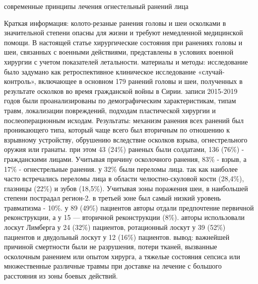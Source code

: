 
современные принципы лечения огнестельный ранений лица

Краткая информация: колото-резаные ранения головы и шеи осколками в значительной
степени опасны для жизни и требуют немедленной медицинской помощи. В настоящей
статье хирургические состояния при ранениях головы и шеи, связанных с военными
действиями, представлены в условиях военной хирургии с учетом показателей
летальности. материалы и методы: исследование было задумано как ретроспективное
клиническое исследование «случай-контроль», включающее в основном 179 ранений
головы и шеи, полученных в результате осколков во время гражданской войны в
Сирии. записи 2015-2019 годов были проанализированы по демографическим
характеристикам, типам травм, локализации повреждений, подходам пластической
хирургии и послеоперационным исходам. Результаты: механизм ранения всех ранений
был проникающего типа, который чаще всего был вторичным по отношению к взрывному
устройству, обрушению вследствие осколков взрыва, огнестрельного оружия или
гранаты. при этом 43 (24\%) раненых были солдатами, 136 (76\%) - гражданскими
лицами. Учитывая причину осколочного ранения, 83\% - взрыв, а 17\% -
огнестрельные ранения. у 32\% были переломы лица. так как наиболее часто
встречались переломы лица в области челюстно-скуловой кости (28,4\%), глазницы
(22\%) и зубов (18,5\%). Учитывая зоны поражения шеи, в наибольшей степени
пострадал регион-2. в третьей зоне был самый низкий уровень травматизма - 10\%.
у 89 (49\%) пациентов авторы отдали предпочтение первичной реконструкции, а у 15
— вторичной реконструкции (8\%). авторы использовали лоскут Лимберга у 24 (32\%)
пациентов, ротационный лоскут у 39 (52\%) пациентов и двудольный лоскут у 12
(16\%) пациентов. вывод: важнейшей причиной смертности были не разрушения,
потери тканей, вызванные осколочным ранением или опытом хирурга, а тяжелые
состояния сепсиса или множественные различные травмы при доставке на лечение с
большого расстояния из зоны боевых действий.\cite{32209930}


